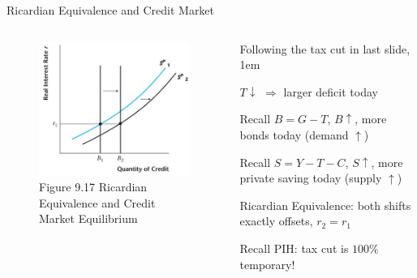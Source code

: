 \documentclass[11pt,aspectratio=43,usenames,dvipsnames]{beamer}
\let\olditemize=\itemize
\let\endolditemize=\enditemize
\renewenvironment{itemize}{\olditemize \itemsep1em}{\endolditemize}
\theoremstyle{definition}
\begin{document}
\begin{frame}{Ricardian Equivalence and Credit Market}
\label{slide:Ricardian_Equivalence_and_Credit_Market}
    \begin{columns}
        \begin{column}{0.5\textwidth}
            \begin{figure}
                \caption{\scriptsize Figure 9.17  Ricardian Equivalence and Credit Market Equilibrium}
                \includegraphics[width=\textwidth]{./figures/Figure9_17.jpg}
            \end{figure}
        \end{column}
        \begin{column}{0.5\textwidth}
            Following the tax cut in last slide,
            \begin{itemize}
                \item $ T \downarrow  $ $ \Rightarrow  $ larger deficit today
                \item Recall $ B = G - T $, $ B \uparrow  $, more bonds today (demand $ \uparrow  $)
                \item Recall $ S = Y - T - C $, $ S \uparrow  $, more private saving today (supply $ \uparrow  $)
                \item Ricardian Equivalence: both shifts \alert{exactly} offsets, $ r_{2} = r_{1} $
                \item Recall PIH: tax cut is $ 100\% $ temporary!
            \end{itemize}
        \end{column}
    \end{columns}
\end{frame}
\end{document}
